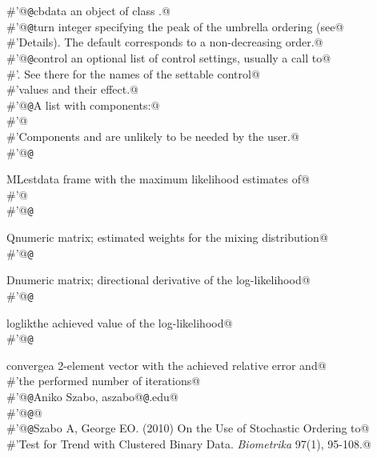 \documentclass[reqno]{amsart}
\begin{document}
\begin{flushleft}
\begin{list}{}{}
\mbox{}\verb@#'@{\tt @}\verb@param cbdata an object of class .@\\
\mbox{}\verb@#'@{\tt @}\verb@param turn integer specifying the peak of the umbrella ordering (see@\\
\mbox{}\verb@#'Details). The default corresponds to a non-decreasing order.@\\
\mbox{}\verb@#'@{\tt @}\verb@param control an optional list of control settings, usually a call to@\\
\mbox{}\verb@#'.  See there for the names of the settable control@\\
\mbox{}\verb@#'values and their effect.@\\
\mbox{}\verb@#'@{\tt @}\verb@return A list with components:@\\
\mbox{}\verb@#'@\\
\mbox{}\verb@#'Components  and  are unlikely to be needed by the user.@\\
\mbox{}\verb@#'@{\tt @}\verb@return \item{MLest}{data frame with the maximum likelihood estimates of@\\
\mbox{}\verb@#'}@\\
\mbox{}\verb@#'@{\tt @}\verb@return \item{Q}{numeric matrix; estimated weights for the mixing distribution}@\\
\mbox{}\verb@#'@{\tt @}\verb@return \item{D}{numeric matrix; directional derivative of the log-likelihood}@\\
\mbox{}\verb@#'@{\tt @}\verb@return \item{loglik}{the achieved value of the log-likelihood}@\\
\mbox{}\verb@#'@{\tt @}\verb@return \item{converge}{a 2-element vector with the achieved relative error and@\\
\mbox{}\verb@#'the performed number of iterations}@\\
\mbox{}\verb@#'@{\tt @}\verb@author Aniko Szabo, aszabo@{\tt @}\verb@mcw.edu@\\
\mbox{}\verb@#'@{\tt @}\verb@seealso {}@\\
\mbox{}\verb@#'@{\tt @}\verb@references Szabo A, George EO. (2010) On the Use of Stochastic Ordering to@\\
\mbox{}\verb@#'Test for Trend with Clustered Binary Data. \emph{Biometrika} 97(1), 95-108.@\\

\end{list}
\end{flushleft}
\end{document}
